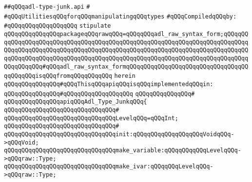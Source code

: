 \label{src/lib/compiler/back/low/tools/arch/adl-type-junk.api}
\verb|##qQQqadl-type-junk.api|\newline
\verb|#|\newline
\verb|#qQQqUtilitiesqQQqforqQQqmanipulatingqQQqtypes|\newline
\newline
\verb|#qQQqCompiledqQQqby:|\newline
\verb|#qQQqqQQqqQQqqQQqqQQq|\newline
\newline
\newline
\verb|stipulate|\newline
\verb|qQQqqQQqqQQqqQQqpackageqQQqrawqQQq=qQQqqQQqadl_raw_syntax_form;qQQqqQQqqQQqqQQqqQQqqQQqqQQqqQQqqQQqqQQqqQQqqQQqqQQqqQQqqQQqqQQqqQQqqQQqqQQqqQQqqQQqqQQqqQQqqQQqqQQqqQQqqQQqqQQqqQQqqQQqqQQqqQQqqQQqqQQqqQQqqQQqqQQqqQQqqQQqqQQqqQQqqQQqqQQqqQQqqQQqqQQqqQQqqQQqqQQqqQQqqQQqqQQqqQQqqQQqqQQqqQQqqQQq#qQQqadl_raw_syntax_formqQQqqQQqqQQqqQQqqQQqqQQqqQQqqQQqqQQqqQQqqQQqisqQQqfromqQQqqQQqqQQq|\newline
\verb|herein|\newline
\newline
\verb|qQQqqQQqqQQqqQQq#qQQqThisqQQqapiqQQqisqQQqimplementedqQQqin:|\newline
\verb|qQQqqQQqqQQqqQQq#qQQqqQQqqQQqqQQqqQQq|\newline
\verb|qQQqqQQqqQQqqQQq#|\newline
\verb|qQQqqQQqqQQqqQQqapiqQQqAdl_Type_JunkqQQq{|\newline
\verb|qQQqqQQqqQQqqQQqqQQqqQQqqQQqqQQq#|\newline
\verb|qQQqqQQqqQQqqQQqqQQqqQQqqQQqqQQqLevelqQQq=qQQqInt;|\newline
\verb|qQQqqQQqqQQqqQQqqQQqqQQqqQQqqQQq#|\newline
\verb|qQQqqQQqqQQqqQQqqQQqqQQqqQQqqQQqinit:qQQqqQQqqQQqqQQqqQQqVoidqQQq->qQQqVoid;|\newline
\verb|qQQqqQQqqQQqqQQqqQQqqQQqqQQqqQQqmake_variable:qQQqqQQqqQQqLevelqQQq->qQQqraw::Type;|\newline
\verb|qQQqqQQqqQQqqQQqqQQqqQQqqQQqqQQqmake_ivar:qQQqqQQqLevelqQQq->qQQqraw::Type;|\newline
